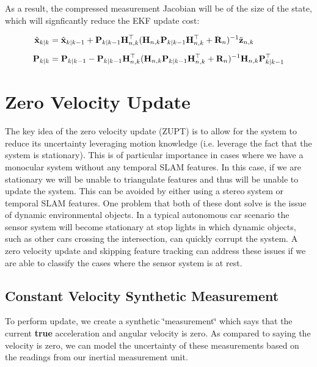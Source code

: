 As a result, the compressed measurement Jacobian will be of the size of the state, which will signficantly reduce the E\+KF update cost\+:

\begin{align*} \hat{\mathbf{x}}_{k|k} &= \hat{\mathbf{x}}_{k|k-1} + \mathbf{P}_{k|k-1} \mathbf{H}_{n,k}^\top (\mathbf{H}_{n,k} \mathbf{P}_{k|k-1} \mathbf{H}_{n,k}^\top + \mathbf{R}_n)^{-1}\tilde{\mathbf{z}}_{n,k} \\[5px] \empty \mathbf{P}_{k|k} &= \mathbf{P}_{k|k-1} - \mathbf{P}_{k|k-1}\mathbf{H}_{n,k}^\top (\mathbf{H}_{n,k}\mathbf{P}_{k|k-1} \mathbf{H}_{n,k}^\top + \mathbf{R}_n)^{-1} \mathbf{H}_{n,k} \mathbf{P}_{k|k-1}^\top \end{align*} \hypertarget{update-zerovelocity}{}\section{Zero Velocity Update}\label{update-zerovelocity}
The key idea of the zero velocity update (Z\+U\+PT) is to allow for the system to reduce its uncertainty leveraging motion knowledge (i.\+e. leverage the fact that the system is stationary). This is of particular importance in cases where we have a monocular system without any temporal S\+L\+AM features. In this case, if we are stationary we will be unable to triangulate features and thus will be unable to update the system. This can be avoided by either using a stereo system or temporal S\+L\+AM features. One problem that both of these don\textquotesingle{}t solve is the issue of dynamic environmental objects. In a typical autonomous car scenario the sensor system will become stationary at stop lights in which dynamic objects, such as other cars crossing the intersection, can quickly corrupt the system. A zero velocity update and skipping feature tracking can address these issues if we are able to classify the cases where the sensor system is at rest.\hypertarget{update-zerovelocity_update-zerovelocity-meas}{}\subsection{Constant Velocity Synthetic Measurement}\label{update-zerovelocity_update-zerovelocity-meas}
To perform update, we create a synthetic \char`\"{}measurement\char`\"{} which says that the current {\bfseries true} acceleration and angular velocity is zero. As compared to saying the velocity is zero, we can model the uncertainty of these measurements based on the readings from our inertial measurement unit.

